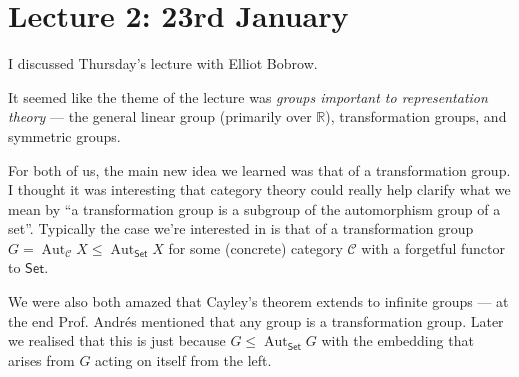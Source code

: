 \section{Lecture 2: 23rd January}

I discussed Thursday's lecture with Elliot Bobrow.

It seemed like the theme of the lecture was \emph{groups important to representation theory} --- the general linear group (primarily over $\mathbb{R}$), transformation groups, and symmetric groups.

For both of us, the main new idea we learned was that of a transformation group. I thought it was interesting that category theory could really help clarify what we mean by ``a transformation group is a subgroup of the automorphism group of a set''. Typically the case we're interested in is that of a transformation group $G = \operatorname{Aut}_{\mathscr{C}} X \le \operatorname{Aut}_{\mathsf{Set}} X$ for some (concrete) category $\mathscr{C}$ with a forgetful functor to $\mathsf{Set}$.

We were also both amazed that Cayley's theorem extends to infinite groups --- at the end Prof. Andr\'es mentioned that any group is a transformation group. Later we realised that this is just because $G \le \operatorname{Aut}_{\mathsf{Set}} G$ with the embedding that arises from $G$ acting on itself from the left.
